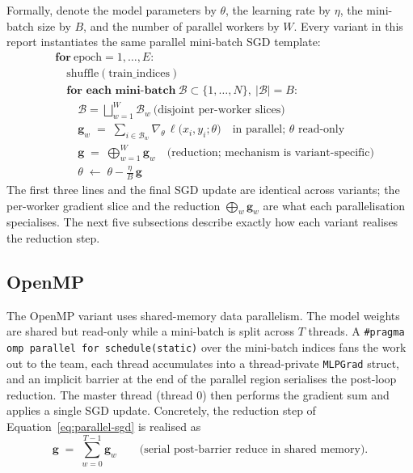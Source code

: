 \documentclass[11pt,a4paper]{article}
\begin{document}
Formally, denote the model parameters by $\theta$, the learning rate by
$\eta$, the mini-batch size by $B$, and the number of parallel workers by
$W$. Every variant in this report instantiates the same parallel
mini-batch SGD template:
\begin{equation}\label{eq:parallel-sgd}
\begin{aligned}
&\textbf{for}\ \mathrm{epoch}=1,\dots,E:\\
&\quad \mathrm{shuffle}(\mathrm{train\_indices})\\
&\quad \textbf{for each mini-batch}\ \mathcal{B}\subset\{1,\dots,N\},\ |\mathcal{B}|=B:\\
&\qquad \mathcal{B}=\bigsqcup_{w=1}^{W}\mathcal{B}_{w}\ \text{(disjoint per-worker slices)}\\
&\qquad \mathbf{g}_{w}\;=\;\sum_{i\in\mathcal{B}_{w}}\nabla_{\theta}\,\ell\bigl(x_{i},y_{i};\theta\bigr)
       \quad\text{in parallel; $\theta$ read-only}\\
&\qquad \mathbf{g}\;=\;\mathop{\textstyle\bigoplus}_{w=1}^{W}\mathbf{g}_{w}
       \quad\text{(reduction; mechanism is variant-specific)}\\
&\qquad \theta\;\leftarrow\;\theta-\tfrac{\eta}{B}\,\mathbf{g}
\end{aligned}
\end{equation}
The first three lines and the final SGD update are identical across
variants; the per-worker gradient slice and the reduction
$\bigoplus_{w}\mathbf{g}_{w}$ are what each parallelisation specialises.
The next five subsections describe exactly how each variant realises the
reduction step.

\subsection{OpenMP}\label{sec:openmp}

The OpenMP variant uses shared-memory data parallelism. The model weights
are shared but read-only while a mini-batch is split across $T$ threads.
A \verb|#pragma omp parallel for schedule(static)| over the mini-batch
indices fans the work out to the team, each thread accumulates into a
thread-private \texttt{MLPGrad} struct, and an implicit barrier at the
end of the parallel region serialises the post-loop reduction. The master
thread (thread 0) then performs the gradient sum and applies a single SGD
update. Concretely, the reduction step of
Equation~\eqref{eq:parallel-sgd} is realised as
\begin{equation}\label{eq:omp-reduce}
  \mathbf{g}\;=\;\sum_{w=0}^{T-1}\mathbf{g}_{w}
  \qquad\text{(serial post-barrier reduce in shared memory)}.
\end{equation}
\end{document}
